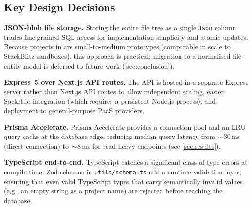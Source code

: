 \subsection{Key Design Decisions}

\textbf{JSON-blob file storage.}
Storing the entire file tree as a single \texttt{Json} column trades
fine-grained SQL access for implementation simplicity and atomic updates.
Because projects in \echoray{} are small-to-medium prototypes (comparable in
scale to StackBlitz sandboxes), this approach is practical; migration to a
normalised file-entity model is deferred to future work (\cref{sec:conclusion}).

\textbf{Express~5 over Next.js API routes.}
The API is hosted in a separate Express server rather than Next.js API routes
to allow independent scaling, easier Socket.io integration (which requires a
persistent Node.js process), and deployment to general-purpose PaaS providers.

\textbf{Prisma Accelerate.}
Prisma Accelerate provides a connection pool and an LRU query cache at the
database edge, reducing median query latency from~$\sim$30\,ms (direct
connection) to~$\sim$8\,ms for read-heavy endpoints (see \cref{sec:results}).

\textbf{TypeScript end-to-end.}
TypeScript catches a significant class of type errors at compile time. Zod
schemas in \texttt{utils/schema.ts} add a runtime validation layer, ensuring
that even valid TypeScript types that carry semantically invalid values (e.g.,
an empty string as a project name) are rejected before reaching the database.
